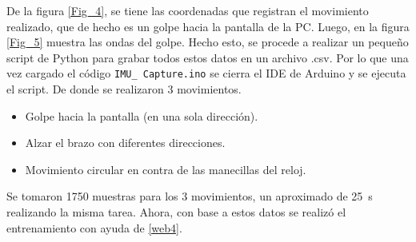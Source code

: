 De la figura \ref{Fig_4}, se tiene las coordenadas que registran el movimiento realizado, que de hecho es un golpe hacia la pantalla de la PC. Luego, en la figura \ref{Fig_5} muestra las ondas del golpe. Hecho esto, se procede a realizar un pequeño script de Python para grabar todos estos datos en un archivo .csv. Por lo que una vez cargado el código \texttt{IMU\_ Capture.ino} se cierra el IDE de Arduino y se ejecuta el script. De donde se realizaron 3 movimientos.
\begin{itemize}
\item Golpe hacia la pantalla (en una sola dirección).
\item Alzar el brazo con diferentes direcciones.
 \item Movimiento circular en contra de las manecillas del reloj.
\end{itemize}
Se tomaron 1750 muestras para los 3 movimientos, un aproximado de \SI{25}{\s} realizando la misma tarea. Ahora, con base a estos datos se realizó el entrenamiento con ayuda de \ref{web4}.



\newpage